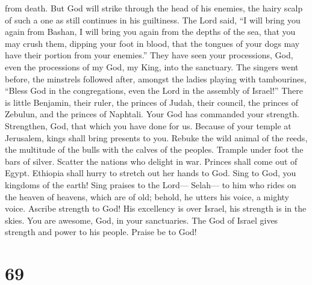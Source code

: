 from death.  But God will strike through the head of his
enemies, the hairy scalp of such a one as still continues in his
guiltiness.  The Lord said, ``I will bring you again from
Bashan, I will bring you again from the depths of the sea,
 that you may crush them, dipping your foot in blood,
that the tongues of your dogs may have their portion from your
enemies.''  They have seen your processions, God, even
the processions of my God, my King, into the sanctuary. 
The singers went before, the minstrels followed after, amongst the
ladies playing with tambourines,  ``Bless God in the
congregations, even the Lord in the assembly of Israel!''
 There is little Benjamin, their ruler, the princes of
Judah, their council, the princes of Zebulun, and the princes of
Naphtali.  Your God has commanded your strength.
Strengthen, God, that which you have done for us. 
Because of your temple at Jerusalem, kings shall bring presents to you.
 Rebuke the wild animal of the reeds, the multitude of
the bulls with the calves of the peoples. Trample under foot the bars of
silver. Scatter the nations who delight in war.  Princes
shall come out of Egypt. Ethiopia shall hurry to stretch out her hands
to God.  Sing to God, you kingdoms of the earth! Sing
praises to the Lord--- Selah---  to him who rides on the
heaven of heavens, which are of old; behold, he utters his voice, a
mighty voice.  Ascribe strength to God! His excellency is
over Israel, his strength is in the skies.  You are
awesome, God, in your sanctuaries. The God of Israel gives strength and
power to his people. Praise be to God!

\hypertarget{section-68}{%
\section{69}\label{section-68}}

